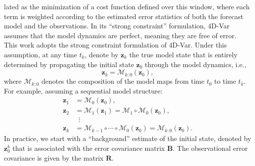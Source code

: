 \documentclass[final,1p,times]{elsarticle}
\begin{document}
lated as the minimization of a cost function defined over this window, where each term is weighted according to the estimated error statistics of both the forecast model and the observations. 
In its ``strong constraint'' formulation, 4D-Var assumes that the model dynamics are perfect, meaning they are free of error. 
This work adopts the strong constraint formulation of 4D-Var. 
Under this assumption, at any time $ t_k $, denote by $ \mathbf{z}_k$ the true model state that is entirely determined by propagating the initial state $\mathbf{z}_0$ through the model dynamics, i.e., 
\begin{equation}
    \mathbf{z}_k = \mathcal{M}_{k:0}(\mathbf{z}_0), 
\end{equation}
where $ \mathcal{M}_{k:0} $ denotes the composition of the model maps from time $ t_0 $ to time $ t_k $. For example, assuming a sequential model structure:
\begin{equation}
\begin{split}
    \mathbf{z}_1 &= \mathcal{M}_{0}(\mathbf{z}_0), \\
    \mathbf{z}_2 &= \mathcal{M}_{1}(\mathbf{z}_1) 
                 = \mathcal{M}_{1} \circ \mathcal{M}_{0}(\mathbf{z}_0), \\
                 &\;\;\vdots \\
    \mathbf{z}_k &= \mathcal{M}_{k-1} \circ \cdots \circ \mathcal{M}_{0}(\mathbf{z}_0) 
                 = \mathcal{M}_{k:0}(\mathbf{z}_0). \label{eq:strong_constraint}
\end{split}
\end{equation}
In practice, we start with a ``background'' estimate of the initial state, denoted by $\mathbf{z}_0^b$ that is associated with the error covariance matrix $ \mathbf{B} $. 
The observational error covariance is given by the matrix $ \mathbf{R} $. 
\end{document}
